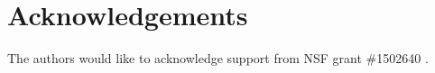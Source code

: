 \documentclass[aoas,preprint, 11pt, dvipsnames, table, x11name]{imsart}
\theoremstyle{remark}
\begin{document}
	
	
	
	
	
	
	
	
	
	
	
	
	\section*{Acknowledgements}
	The authors would like to acknowledge support from NSF grant \#1502640 .
	
	
	
	
	
	
	
	
	
	
	
	
	
	
	
	
	
	
	
	
	
	
	
	
	
	
	
	
	
	
	
	
	
	
	
	
	
	
	
	
	
	
	\clearpage 
	
	
\end{document}
